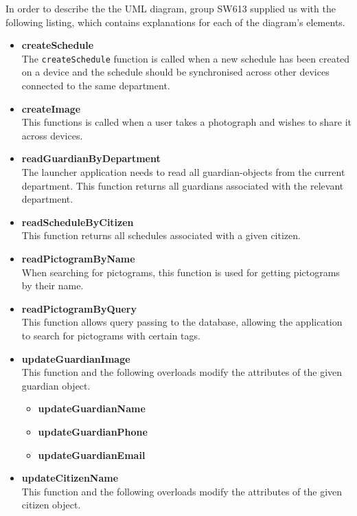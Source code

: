
In order to describe the the UML diagram, group SW613 supplied us with the
following listing, which contains explanations for each of the diagram's
elements.

\begin{itemize}
    \item \textbf{createSchedule}\\
    The \texttt{createSchedule} function is called when a new schedule has been created on a device and the schedule should be synchronised across other devices connected to the same department.
    \item \textbf{createImage}\\
    This functions is called when a user takes a photograph and wishes to share it across devices.
    \item \textbf{readGuardianByDepartment}\\
    The launcher application needs to read all guardian-objects from the current department. This function returns all guardians associated with the relevant department.
    \item \textbf{readScheduleByCitizen}\\
    This function returns all schedules associated with a given citizen.
    \item \textbf{readPictogramByName}\\
    When searching for pictograms, this function is used for getting pictograms by their name.
    \item \textbf{readPictogramByQuery}\\
    This function allows query passing to the database, allowing the application to search for pictograms with certain tags.
    \item \textbf{updateGuardianImage}\\
    This function and the following overloads modify the attributes of the given guardian object.
    \begin{itemize}
        \item \textbf{updateGuardianName}
        \item \textbf{updateGuardianPhone}
        \item \textbf{updateGuardianEmail}
    \end{itemize}
    \item \textbf{updateCitizenName}\\
    This function and the following overloads modify the attributes of the given citizen object.

\end{itemize}
